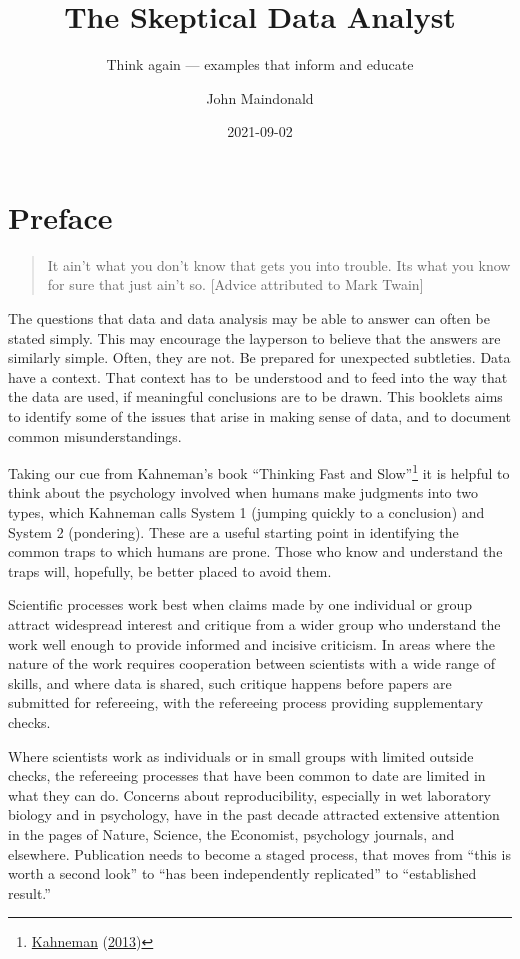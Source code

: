 \documentclass[
  10pt,
  b5paper]{book}
\title{The Skeptical Data Analyst}
\subtitle{Think again --- examples that inform and educate}
\author{John Maindonald}
\date{2021-09-02}
\begin{document}
\maketitle

{
\hypersetup{linkcolor=}
\setcounter{tocdepth}{1}
\tableofcontents
}
\renewcommand{\bibname}{References}

\hypertarget{preface}{%
\chapter*{Preface}\label{preface}}

\begin{quote}
It ain't what you don't know that gets you into trouble.
Its what you know for sure that just ain't so.
{[}Advice attributed to Mark Twain{]}
\end{quote}

The questions that data and data analysis may be able to answer can
often be stated simply. This may encourage the layperson to believe
that the answers are similarly simple. Often, they are not. Be
prepared for unexpected subtleties. Data have a context. That context
has to~be understood and to feed into the way that the data are used,
if meaningful conclusions are to be drawn. This booklets aims to
identify some of the issues that arise in making sense of data,
and to document common misunderstandings.

Taking our cue from Kahneman's book ``Thinking Fast and Slow''\footnote{\protect\hyperlink{ref-kahneman_2013}{Kahneman} (\protect\hyperlink{ref-kahneman_2013}{2013})}
it is helpful to think about the psychology involved when
humans make judgments into two types, which Kahneman calls System 1
(jumping quickly to a conclusion) and System 2 (pondering).
These are a useful starting point in identifying the common traps
to which humans are prone. Those who know and understand the traps
will, hopefully, be better placed to avoid them.

Scientific processes work best when claims made by one individual
or group attract widespread interest and critique from a wider group
who understand the work well enough to provide informed and incisive
criticism. In areas where the nature of the work requires
cooperation between scientists with a wide range of skills, and
where data is shared, such critique happens before papers are
submitted for refereeing, with the refereeing process providing
supplementary checks.

Where scientists work as individuals or in small groups with
limited outside checks, the refereeing processes that have been
common to date are limited in what they can do. Concerns about
reproducibility, especially in wet laboratory biology and in psychology,
have in the past decade attracted extensive attention in the pages of
Nature, Science, the Economist, psychology journals, and elsewhere.
Publication needs to become a staged process, that moves from
``this is worth a second look'' to ``has been independently replicated''
to ``established result.''
\end{document}
